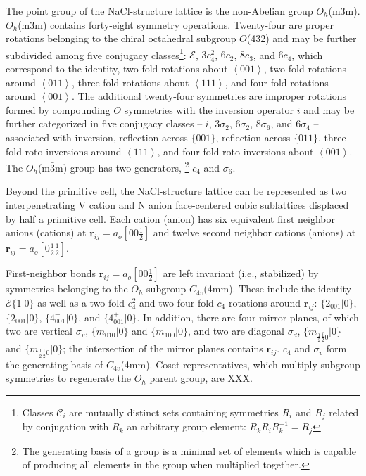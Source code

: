 \documentclass[twocolumn,showpacs,preprintnumbers,superscriptaddress,prb,floatfix,aps,10pt]{revtex4-1}
\renewcommand{\vec}[1]{\ensuremath{\mathbf{#1}}}
\newcommand*{\class}{\mathcal{C}}
\newcommand*{\id}{\mathcal{E}}
\newcommand*{\bondvec}{\vec{r}_{ij}}
\newcommand{\seitz}[2]{\{#1|#2\}}
\begin{document}
The point group of the NaCl-structure lattice is the non-Abelian group $O_h$(m$\bar{3}$m). $O_h$(m$\bar{3}$m) contains forty-eight symmetry operations. Twenty-four are proper rotations belonging to the chiral octahedral subgroup $O$(432) and may be further subdivided among five conjugacy classes\footnote{Classes $\class_i$ are mutually distinct sets containing symmetries $R_i$ and $R_j$ related by conjugation with $R_k$ an arbitrary group element: $R_kR_iR_k^{-1}=R_j$}: $\id$, $3c_4^2$, $6c_2$, $8c_3$, and $6c_4$, which correspond to the identity, two-fold rotations about $\left<001\right>$, two-fold rotations around $\left<011\right>$, three-fold rotations about $\left<111\right>$, and four-fold rotations around $\left<001\right>$. The additional twenty-four symmetries are improper rotations formed by compounding $O$ symmetries with the inversion operator $i$ and may be further categorized in five conjugacy classes -- $i$, $3\sigma_2$, $6\sigma_2$, $8\sigma_6$, and $6\sigma_4$ -- associated with inversion, reflection across $\{001\}$, reflection across $\{011\}$, three-fold roto-inversions around $\left<111\right>$, and four-fold roto-inversions about $\left<001\right>$. The $O_h$(m$\bar{3}$m) group has two generators, \footnote{The generating basis of a group is a minimal set of elements which is capable of producing all elements in the group when multiplied together.} $c_4$ and $\sigma_6$.


Beyond the primitive cell, the NaCl-structure lattice can be represented as two interpenetrating V cation and N anion face-centered cubic sublattices displaced by half a primitive cell. Each cation (anion) has six equivalent first neighbor anions (cations) at $\bondvec = a_o [0 0 \frac{1}{2}]$ and twelve second neighbor cations (anions) at $\bondvec = a_o[0 \frac{1}{2} \frac{1}{2}]$. 

First-neighbor bonds $\bondvec = a_o[00\frac{1}{2}]$ are left invariant (i.e., stabilized) by symmetries belonging to the $O_h$ subgroup $C_{4v}$(4mm). These include the identity $\id \seitz{1}{0}$ as well as a two-fold $c_{4}^2$ and two four-fold $c_{4}$ rotations around $\bondvec$: $\seitz{2_{001}}{0}$, $\seitz{2_{001}}{0}$, $\seitz{4^-_{001}}{0}$, and $\seitz{4^+_{001}}{0}$. In addition, there are four mirror planes, of which two are vertical $\sigma_v$, $\seitz{m_{010}}{0}$ and $\seitz{m_{100}}{0}$, and two are diagonal $\sigma_d$, $\seitz{m_{\frac{1}{2}\bar{\frac{1}{2}}0}}{0}$ and $\seitz{m_{\frac{1}{2}\frac{1}{2}0}}{0}$; the intersection of the mirror planes contains $\bondvec$. $c_4$ and $\sigma_v$ form the generating basis of $C_{4v}$(4mm). Coset representatives, which multiply subgroup symmetries to regenerate the $O_h$ parent group, are XXX.
\end{document}
